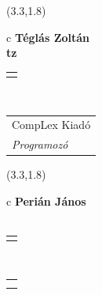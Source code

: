 \documentclass[11pt]{article}
\begin{document}
\makebox(3.3,1.8){
  \renewcommand\arraystretch{1.3}
  \begin{tabular}[c]{c}
    \hspace{8.5mm}
    \LARGE\bf{ Téglás Zoltán }\\
    \hspace{8.5mm}
    \Large{ tz }\\
    \renewcommand\arraystretch{3}
    \begin{tabular}[c]{c}
      \centering
      \fontfamily{phv}\selectfont{
        \textbf{
          \textsc{
            \scriptsize{
            \color{Dark}{ Ismerkedő }\color{Bright}{ Webmester }\color{Bright}{ Sminkmester }\color{Bright}{ Programozó }
            }
          }
        }
      }
    \end{tabular}
    \\
    \renewcommand\arraystretch{1}
    \begin{tabular}{p{3.3in}}
      \hspace{.7cm}CompLex Kiadó\\
      \hspace{.7cm}\emph{ Programozó }\\
    \end{tabular}
  \end{tabular}
}

\makebox(3.3,1.8){
  \renewcommand\arraystretch{1.3}
  \begin{tabular}[c]{c}
    \hspace{8.5mm}
    \LARGE\bf{ Perián János }\\
    \hspace{8.5mm}
    \Large{  }\\
    \renewcommand\arraystretch{3}
    \begin{tabular}[c]{c}
      \centering
      \fontfamily{phv}\selectfont{
        \textbf{
          \textsc{
            \scriptsize{
            \color{Bright}{ Ismerkedő }\color{Dark}{ Webmester }\color{Bright}{ Sminkmester }\color{Bright}{ Programozó }
            }
          }
        }
      }
    \end{tabular}
    \\
    \renewcommand\arraystretch{1}
    \begin{tabular}{p{3.3in}}
      \hspace{.7cm}\\
      \hspace{.7cm}\emph{  }\\
    \end{tabular}
  \end{tabular}
}
\end{document}
